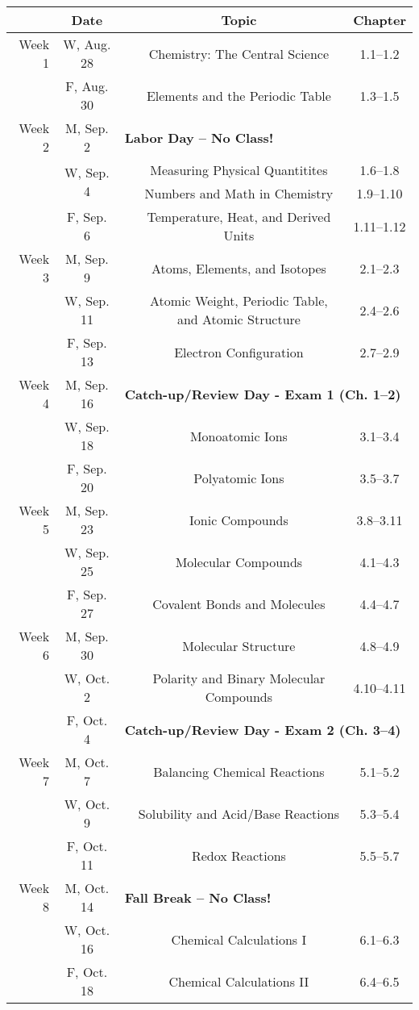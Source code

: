 \begin{tabular}{rcccc}
& Date && Topic & Chapter\\
\midrule
Week 1 & W, Aug. 28&& Chemistry: The Central Science & 1.1--1.2\\
& F, Aug. 30&& Elements and the Periodic Table & 1.3--1.5\\
\midrule
Week 2 & M, Sep. 2& \multicolumn{3}{l}{\textbf{Labor Day -- No Class!}}\\
& \multirow{2}{*}{W, Sep. 4}& & Measuring Physical Quantitites & 1.6--1.8\\
& & & Numbers and Math in Chemistry & 1.9--1.10\\
& F, Sep. 6&& Temperature, Heat, and Derived Units & 1.11--1.12\\
\midrule
Week 3 & M, Sep. 9&& Atoms, Elements, and Isotopes & 2.1--2.3\\
& W, Sep. 11&& Atomic Weight, Periodic Table, and Atomic Structure & 2.4--2.6\\
& F, Sep. 13&& Electron Configuration & 2.7--2.9\\
\midrule
Week 4 & M, Sep. 16& \multicolumn{3}{l}{\textbf{Catch-up/Review Day - Exam 1 (Ch. 1--2)}}\\
& W, Sep. 18&& Monoatomic Ions & 3.1--3.4\\
& F, Sep. 20&& Polyatomic Ions & 3.5--3.7\\
\midrule
Week 5 & M, Sep. 23&& Ionic Compounds & 3.8--3.11\\
& W, Sep. 25&& Molecular Compounds & 4.1--4.3\\
& F, Sep. 27&& Covalent Bonds and Molecules & 4.4--4.7\\
\midrule
Week 6 & M, Sep. 30&& Molecular Structure & 4.8--4.9\\
& W, Oct. 2&& Polarity and Binary Molecular Compounds & 4.10--4.11\\
& F, Oct. 4& \multicolumn{3}{l}{\textbf{Catch-up/Review Day - Exam 2 (Ch. 3--4)}}\\
\midrule
Week 7 & M, Oct. 7&& Balancing Chemical Reactions & 5.1--5.2\\
& W, Oct. 9&& Solubility and Acid/Base Reactions & 5.3--5.4\\
& F, Oct. 11&& Redox Reactions & 5.5--5.7\\
\midrule
Week 8 & M, Oct. 14& \multicolumn{3}{l}{\textbf{Fall Break -- No Class!}}\\
& W, Oct. 16&& Chemical Calculations I & 6.1--6.3\\
& F, Oct. 18&& Chemical Calculations II & 6.4--6.5\\

\end{tabular}
